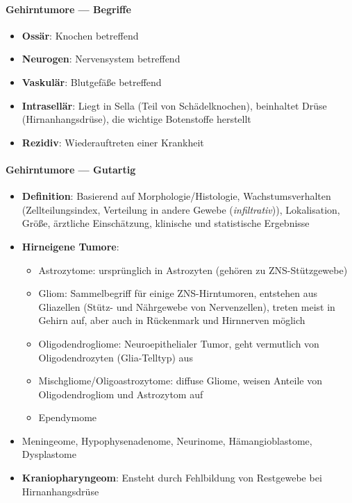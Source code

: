 \paragraph{Gehirntumore --- Begriffe}
\begin{itemize}
  \item \textbf{Ossär}: Knochen betreffend
  \item \textbf{Neurogen}: Nervensystem betreffend
  \item \textbf{Vaskulär}: Blutgefäße betreffend
  \item \textbf{Intrasellär}: Liegt in Sella (Teil von Schädelknochen), beinhaltet Drüse (Hirn\-an\-hangs\-drüse), die wichtige Botenstoffe herstellt
  \item \textbf{Rezidiv}: Wiederauftreten einer Krankheit
\end{itemize}

\paragraph{Gehirntumore --- Gutartig}
\begin{itemize}
  \item \textbf{Definition}: Basierend auf Morphologie/Histologie, Wachstumsverhalten (Zellteilungsindex, Verteilung in andere Gewebe (\emph{infiltrativ})), Lokalisation, Größe, ärztliche Einschätzung, klinische und statistische Ergebnisse
  \item \textbf{Hirneigene Tumore}:
  \begin{itemize}
    \item Astrozytome: ursprünglich in Astrozyten (gehören zu ZNS-Stützgewebe)
    \item Gliom: Sammelbegriff für einige ZNS-Hirntumoren, entstehen aus Gliazellen (Stütz- und Nährgewebe von Nervenzellen), treten meist in Gehirn auf, aber auch in Rückenmark und Hirnnerven möglich
    \item Oligodendrogliome: Neuroepithelialer Tumor, geht vermutlich von Oligodendrozyten (Glia-Telltyp) aus
    \item Mischgliome/Oligoastrozytome: diffuse Gliome, weisen Anteile von Oligodendrogliom und Astrozytom auf
    \item Ependymome
  \end{itemize}
  \item Meningeome, Hypophysenadenome, Neurinome, Hämangioblastome, Dysplastome
  \item \textbf{Kraniopharyngeom}: Ensteht durch Fehlbildung von Restgewebe bei Hirnanhangsdrüse
\end{itemize}

